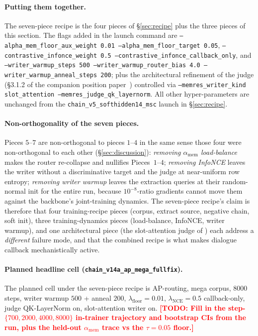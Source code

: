 \documentclass{article}
\newcommand{\todo}[1]{\textcolor{red}{\textbf{[TODO: #1]}}}
\newcommand{\amem}{\alpha_{\text{mem}}}
\begin{document}
\paragraph{Putting them together.} The seven-piece recipe is
the four pieces of \S\ref{sec:recipe} plus the three pieces of
this section. The flags added in the launch command are
\texttt{--alpha\_mem\_floor\_aux\_weight 0.01 --alpha\_mem\_floor\_target 0.05},
\texttt{--contrastive\_infonce\_weight 0.5 --contrastive\_infonce\_callback\_only},
and \texttt{--writer\_warmup\_steps 500 --writer\_warmup\_router\_bias 4.0 --writer\_warmup\_anneal\_steps 200};
plus the architectural refinement of the judge (\S3.1.2 of the
companion position paper~\cite{liu2025memres}) controlled via
\texttt{--memres\_writer\_kind slot\_attention --memres\_judge\_qk\_layernorm}.
All other hyper-parameters are unchanged from the
\texttt{chain\_v5\_softhidden14\_msc} launch in \S\ref{sec:recipe}.

\paragraph{Non-orthogonality of the seven pieces.} Pieces $5$--$7$
are non-orthogonal to pieces $1$--$4$ in the same sense those four
were non-orthogonal to each other (\S\ref{sec:discussion}):
\emph{removing $\amem$ load-balance} makes the router re-collapse
and nullifies Pieces~$1$--$4$; \emph{removing InfoNCE} leaves the
writer without a discriminative target and the judge at near-uniform
row entropy; \emph{removing writer warmup} leaves the extraction
queries at their random-normal init for the entire run, because
$10^{-8}$-ratio gradients cannot move them against the backbone's
joint-training dynamics. The seven-piece recipe's claim is therefore
that four training-recipe pieces (corpus, extract source, negative
chain, soft init), three training-dynamics pieces (load-balance,
InfoNCE, writer warmup), and one architectural piece (the
slot-attention judge of \cite{liu2025memres}) each address a
\emph{different} failure mode, and that the combined recipe is
what makes dialogue callback mechanistically active.

\paragraph{Planned headline cell (\texttt{chain\_v14a\_ap\_mega\_fullfix}).}
The planned cell under the seven-piece recipe is AP-routing, mega
corpus, $8000$ steps, writer warmup $500$ + anneal $200$,
$\lambda_{\text{floor}}=0.01$, $\lambda_{\text{NCE}}=0.5$
callback-only, judge QK-LayerNorm on, slot-attention writer on.
\todo{Fill in the step-$\{700, 2000, 4000, 8000\}$ in-trainer
trajectory and bootstrap CIs from the run, plus the held-out
$\amem$ trace vs the $\tau{=}0.05$ floor.}
\end{document}
